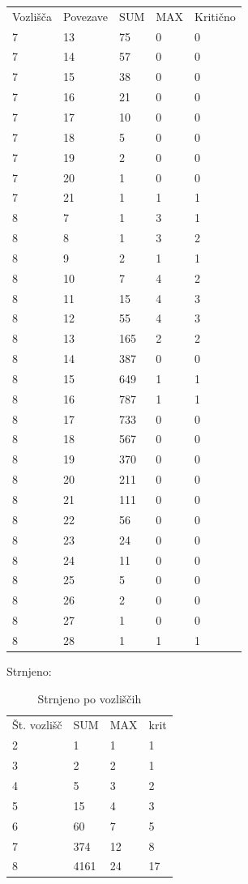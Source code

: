\documentclass[fin1, tisk]{fmfdelo}
\begin{document}
\begin{tabular}{lllll}
    Vozlišča & Povezave & SUM & MAX & Kritično \\ 
    7 & 13 & 75 & 0 & 0 \\ 
    7 & 14 & 57 & 0 & 0 \\ 
    7 & 15 & 38 & 0 & 0 \\ 
    7 & 16 & 21 & 0 & 0 \\ 
    7 & 17 & 10 & 0 & 0 \\ 
    7 & 18 & 5 & 0 & 0 \\ 
    7 & 19 & 2 & 0 & 0 \\ 
    7 & 20 & 1 & 0 & 0 \\ 
    7 & 21 & 1 & 1 & 1 \\ 
    8 & 7 & 1 & 3 & 1 \\ 
    8 & 8 & 1 & 3 & 2 \\ 
    8 & 9 & 2 & 1 & 1 \\ 
    8 & 10 & 7 & 4 & 2 \\ 
    8 & 11 & 15 & 4 & 3 \\ 
    8 & 12 & 55 & 4 & 3 \\ 
    8 & 13 & 165 & 2 & 2 \\ 
    8 & 14 & 387 & 0 & 0 \\ 
    8 & 15 & 649 & 1 & 1 \\ 
    8 & 16 & 787 & 1 & 1 \\ 
    8 & 17 & 733 & 0 & 0 \\ 
    8 & 18 & 567 & 0 & 0 \\ 
    8 & 19 & 370 & 0 & 0 \\ 
    8 & 20 & 211 & 0 & 0 \\ 
    8 & 21 & 111 & 0 & 0 \\ 
    8 & 22 & 56 & 0 & 0 \\ 
    8 & 23 & 24 & 0 & 0 \\ 
    8 & 24 & 11 & 0 & 0 \\ 
    8 & 25 & 5 & 0 & 0 \\ 
    8 & 26 & 2 & 0 & 0 \\ 
    8 & 27 & 1 & 0 & 0 \\ 
    8 & 28 & 1 & 1 & 1 \\ 
\end{tabular}





Strnjeno:

\begin{table}[]
\begin{tabular}{llll}
Št. vozlišč & SUM  & MAX & krit\\
2           & 1    & 1   & 1   \\
3           & 2    & 2   & 1   \\
4           & 5    & 3   & 2   \\
5           & 15   & 4   & 3   \\
6           & 60   & 7   & 5   \\
7           & 374  & 12  & 8   \\
8           & 4161 & 24  & 17 
\end{tabular}
\caption{Strnjeno po vozliščih}
\end{table}
\end{document}
